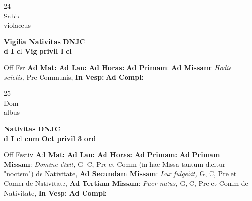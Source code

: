 \documentclass[10pt, openany]{book}
\begin{document}
        \begin{center}
            \begin{minipage}{3.5in}
                \vspace{2em}
                \begin{minipage}{0.5in}
                    {\Huge 24} \\
                    {\normalsize Sabb} \\
                    {\normalsize violaceus}
                \end{minipage}
                \begin{minipage}{3.0in}
                    \textbf{ \large Vigilia Nativitas DNJC \\
                    \textnormal{\normalsize d I cl Vig privil I cl}} \\ 
                \end{minipage}
                \begin{justify}Off Fer
                    \textbf{Ad Mat: }
                    \textbf{Ad Lau: }
                    \textbf{Ad Horas: }
                    \textbf{Ad Primam: }\textbf{Ad Missam}: \textit{Hodie scietis,} Pre Communis,  
                    \textbf{In Vesp: }
                    \textbf{Ad Compl: }
                \end{justify}
            \end{minipage}
        \end{center}
    
        \begin{center}
            \begin{minipage}{3.5in}
                \vspace{2em}
                \begin{minipage}{0.5in}
                    {\Huge 25} \\
                    {\normalsize Dom} \\
                    {\normalsize albus}
                \end{minipage}
                \begin{minipage}{3.0in}
                    \textbf{ \large Nativitas DNJC \\
                    \textnormal{\normalsize d I cl cum Oct privil 3 ord}} \\ 
                \end{minipage}
                \begin{justify}Off Festiv
                    \textbf{Ad Mat: }
                    \textbf{Ad Lau: }
                    \textbf{Ad Horas: }
                    \textbf{Ad Primam: }\textbf{Ad Primam Missam}: \textit{Domine dixit,} G, C, Pre et Comm (in hac Missa tantum dicitur "noctem") de Nativitate,  \textbf{Ad Secundam Missam}: \textit{Lux fulgebit,} G, C, Pre et Comm de Nativitate,  \textbf{Ad Tertiam Missam}: \textit{Puer natus,} G, C, Pre et Comm de Nativitate,  
                    \textbf{In Vesp: }
                    \textbf{Ad Compl: }
                \end{justify}
            \end{minipage}
        \end{center}
    
\end{document}
